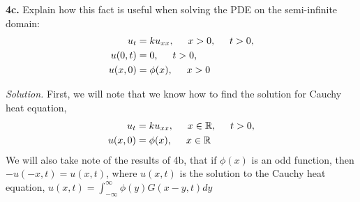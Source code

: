 \documentclass{article}
\begin{document}

\newpage
\textbf{4c.} Explain how this fact is useful when solving the PDE on the semi-infinite domain:
\begin{align}
u_t&=ku_{xx}, \hspace{5mm} x>0, \hspace{5mm}t>0,\\
u(0,t) &= 0, \hspace{5mm} t>0, \\
u(x,0)&= \phi(x), \hspace{5mm} x>0
\end{align}





\vspace{3mm}
\textit{Solution.} First, we will note that we know how to find the solution for Cauchy heat equation,
\begin{align*}
u_t&=ku_{xx}, \hspace{5mm} x\in\mathbb{R}, \hspace{5mm}t>0,\\
u(x,0)&= \phi(x), \hspace{5mm} x \in \mathbb{R} 
\end{align*}
We will also take note of the results of 4b, that if \(\phi(x) \) is an odd function, then \(-u(-x,t) = u(x,t) \), where \(u(x,t) \) is the solution to the Cauchy heat equation, \(u(x,t) = \int_{-\infty}^{\infty} \phi(y) G(x-y,t) dy \)
\end{document}
